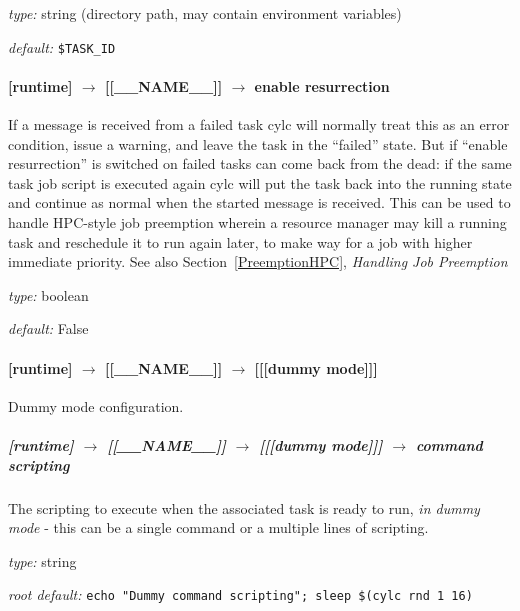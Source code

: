 \begin{myitemize}
\item {\em type:} string (directory path, may contain environment variables)
\item {\em default:} \lstinline=$TASK_ID=
\end{myitemize}



\paragraph[enable resurrection]{ [runtime] $\rightarrow$ [[\_\_NAME\_\_]] $\rightarrow$ enable resurrection}

If a message is received from a failed task cylc will normally treat
this as an error condition, issue a warning, and leave the task in the
``failed'' state.  But if ``enable resurrection'' is switched on failed
tasks can come back from the dead: if the same task job script is
executed again cylc will put the task back into the running state and
continue as normal when the started message is received. This can be
used to handle HPC-style job preemption wherein a resource manager may
kill a running task and reschedule it to run again later, to make way
for a job with higher immediate priority. See also
Section~\ref{PreemptionHPC}, {\em Handling Job Preemption}
\begin{myitemize}
\item {\em type:} boolean
\item {\em default:} False
\end{myitemize}

\paragraph[{[[[}dummy mode{]]]}]{[runtime] $\rightarrow$ [[\_\_NAME\_\_]] $\rightarrow$ [[[dummy mode]]]}

Dummy mode configuration.

\subparagraph[command scripting]{[runtime] $\rightarrow$ [[\_\_NAME\_\_]] $\rightarrow$ [[[dummy mode]]] $\rightarrow$ command scripting}

The scripting to execute when the associated task is ready to run, {\em
in dummy mode} - this can be a single command or a multiple lines of
scripting. 

\begin{myitemize}
\item {\em type:} string
\item {\em root default:} \lstinline=echo "Dummy command scripting"; sleep $(cylc rnd 1 16)=
\end{myitemize}

